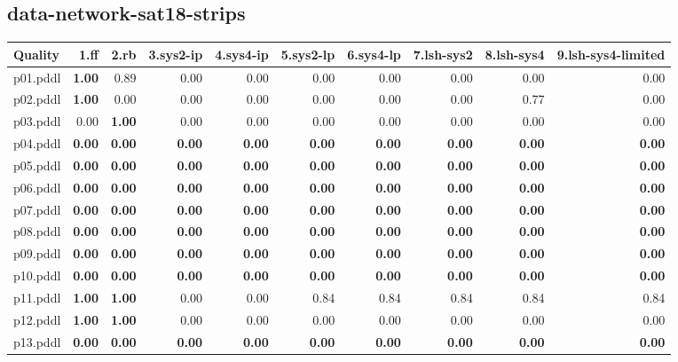 \documentclass{article}
\begin{document}
\hypertarget{quality-data-network-sat18-strips}{}
\subsection*{data-network-sat18-strips}

\begin{tabular}{@{}lrrrrrrrrr@{}}
Quality & 1.ff & 2.rb & 3.sys2-ip & 4.sys4-ip & 5.sys2-lp & 6.sys4-lp & 7.lsh-sys2 & 8.lsh-sys4 & 9.lsh-sys4-limited \\
\midrule
p01.pddl & \textbf{1.00} & 0.89 & 0.00 & 0.00 & 0.00 & 0.00 & 0.00 & 0.00 & 0.00 \\
p02.pddl & \textbf{1.00} & 0.00 & 0.00 & 0.00 & 0.00 & 0.00 & 0.00 & 0.77 & 0.00 \\
p03.pddl & 0.00 & \textbf{1.00} & 0.00 & 0.00 & 0.00 & 0.00 & 0.00 & 0.00 & 0.00 \\
p04.pddl & \textbf{0.00} & \textbf{0.00} & \textbf{0.00} & \textbf{0.00} & \textbf{0.00} & \textbf{0.00} & \textbf{0.00} & \textbf{0.00} & \textbf{0.00} \\
p05.pddl & \textbf{0.00} & \textbf{0.00} & \textbf{0.00} & \textbf{0.00} & \textbf{0.00} & \textbf{0.00} & \textbf{0.00} & \textbf{0.00} & \textbf{0.00} \\
p06.pddl & \textbf{0.00} & \textbf{0.00} & \textbf{0.00} & \textbf{0.00} & \textbf{0.00} & \textbf{0.00} & \textbf{0.00} & \textbf{0.00} & \textbf{0.00} \\
p07.pddl & \textbf{0.00} & \textbf{0.00} & \textbf{0.00} & \textbf{0.00} & \textbf{0.00} & \textbf{0.00} & \textbf{0.00} & \textbf{0.00} & \textbf{0.00} \\
p08.pddl & \textbf{0.00} & \textbf{0.00} & \textbf{0.00} & \textbf{0.00} & \textbf{0.00} & \textbf{0.00} & \textbf{0.00} & \textbf{0.00} & \textbf{0.00} \\
p09.pddl & \textbf{0.00} & \textbf{0.00} & \textbf{0.00} & \textbf{0.00} & \textbf{0.00} & \textbf{0.00} & \textbf{0.00} & \textbf{0.00} & \textbf{0.00} \\
p10.pddl & \textbf{0.00} & \textbf{0.00} & \textbf{0.00} & \textbf{0.00} & \textbf{0.00} & \textbf{0.00} & \textbf{0.00} & \textbf{0.00} & \textbf{0.00} \\
p11.pddl & \textbf{1.00} & \textbf{1.00} & 0.00 & 0.00 & 0.84 & 0.84 & 0.84 & 0.84 & 0.84 \\
p12.pddl & \textbf{1.00} & \textbf{1.00} & 0.00 & 0.00 & 0.00 & 0.00 & 0.00 & 0.00 & 0.00 \\
p13.pddl & \textbf{0.00} & \textbf{0.00} & \textbf{0.00} & \textbf{0.00} & \textbf{0.00} & \textbf{0.00} & \textbf{0.00} & \textbf{0.00} & \textbf{0.00} \\

\end{tabular}
\end{document}
